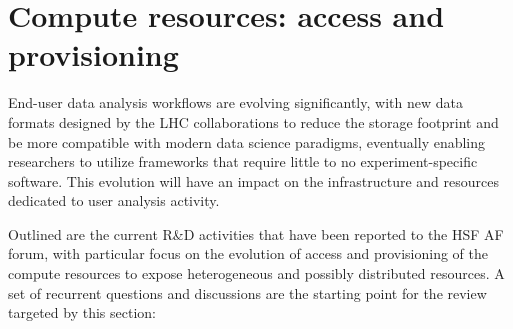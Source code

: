 \section{Compute resources: access and provisioning}
\label{computeresources}


End-user data analysis workflows are evolving significantly, with new data formats designed by the LHC collaborations to reduce the storage footprint and be more compatible with modern data science paradigms, eventually enabling researchers to utilize frameworks that require little to no experiment-specific software. This evolution will have an impact on the infrastructure and resources dedicated to user analysis activity.

Outlined are the current R\&D activities that have been reported to the HSF AF forum, with particular focus on the evolution of access and provisioning of the compute resources to expose heterogeneous and possibly distributed resources. A set of recurrent questions and discussions are the starting point for the review targeted by this section: 
